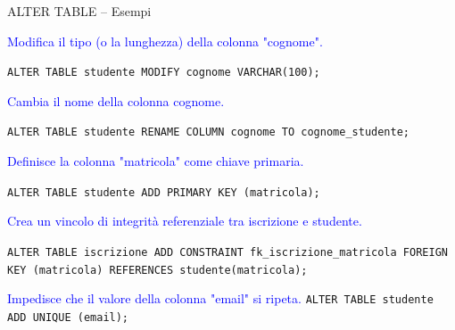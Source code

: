 \documentclass{beamer}
\begin{document}
\begin{frame}[fragile]{ALTER TABLE -- Esempi}
\small

\textcolor{blue}{Modifica il tipo (o la lunghezza) della colonna "cognome".}

\texttt{ALTER TABLE studente MODIFY cognome VARCHAR(100);}

\medskip


\textcolor{blue}{Cambia il nome della colonna cognome.}

\texttt{ALTER TABLE studente RENAME COLUMN cognome TO cognome\_studente;}


\medskip


\textcolor{blue}{Definisce la colonna "matricola" come chiave primaria.}

\texttt{ALTER TABLE studente ADD PRIMARY KEY (matricola);}

\medskip


\textcolor{blue}{Crea un vincolo di integrità referenziale tra iscrizione e studente.}

\texttt{ALTER TABLE iscrizione ADD CONSTRAINT fk\_iscrizione\_matricola FOREIGN KEY (matricola) REFERENCES studente(matricola);}


\medskip


\textcolor{blue}{Impedisce che il valore della colonna "email" si ripeta.}
\texttt{ALTER TABLE studente ADD UNIQUE (email);}
 

\end{frame}
\end{document}
